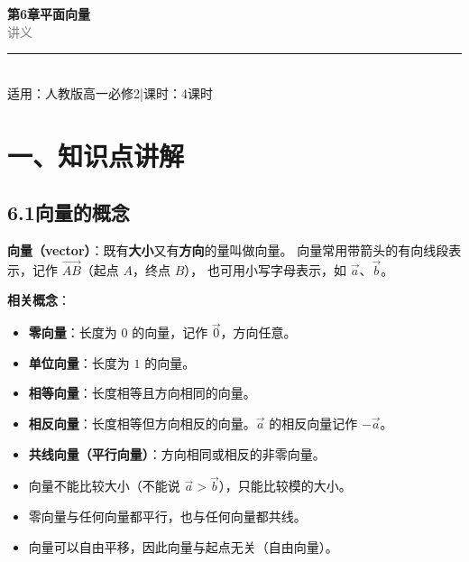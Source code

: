 \documentclass[12pt, a4paper]{ctexart}
\begin{document}
\begin{center}
{\Huge\bfseries\textcolor{mainblue}{第6章\quad 平面向量}}\\[12pt]
{\Large\textcolor{gray}{讲\quad 义}}\\[8pt]
\rule{0.6\textwidth}{1pt}\\[8pt]
{\normalsize 适用：人教版\quad 高一必修2\quad |\quad 课时：4课时}
\end{center}
\vspace{10pt}

\section*{\textcolor{mainblue}{一、知识点讲解}}

\subsection*{6.1\quad 向量的概念}

\begin{knowledgebox}[向量的定义]
\textbf{向量（vector）}：既有\textbf{大小}又有\textbf{方向}的量叫做向量。
向量常用带箭头的有向线段表示，记作 $\overrightarrow{AB}$（起点 $A$，终点 $B$），
也可用小写字母表示，如 $\vec{a}$、$\vec{b}$。

\medskip
\textbf{相关概念}：
\begin{itemize}[leftmargin=2em]
  \item \textbf{零向量}：长度为 $0$ 的向量，记作 $\vec{0}$，方向任意。
  \item \textbf{单位向量}：长度为 $1$ 的向量。
  \item \textbf{相等向量}：长度相等且方向相同的向量。
  \item \textbf{相反向量}：长度相等但方向相反的向量。$\vec{a}$ 的相反向量记作 $-\vec{a}$。
  \item \textbf{共线向量（平行向量）}：方向相同或相反的非零向量。
\end{itemize}
\end{knowledgebox}

\begin{warnbox}[易错提醒]
\begin{itemize}[leftmargin=2em]
  \item 向量不能比较大小（不能说 $\vec{a} > \vec{b}$），只能比较模的大小。
  \item 零向量与任何向量都平行，也与任何向量都共线。
  \item 向量可以自由平移，因此向量与起点无关（自由向量）。
\end{itemize}
\end{warnbox}
\end{document}
